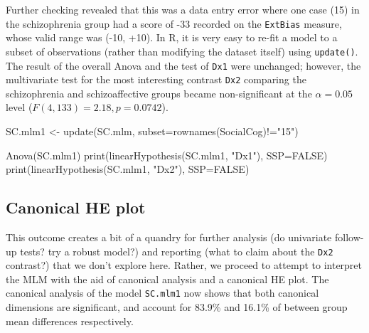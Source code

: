 \documentclass[
  letterpaper,
  10pt,
  krantz2]{krantz}
\makeatletter
\newenvironment{Shaded}{\begin{snugshade}}{\end{snugshade}}
\newcommand{\AttributeTok}[1]{\textcolor[rgb]{0.40,0.45,0.13}{#1}}
\newcommand{\ConstantTok}[1]{\textcolor[rgb]{0.56,0.35,0.01}{#1}}
\newcommand{\FunctionTok}[1]{\textcolor[rgb]{0.28,0.35,0.67}{#1}}
\newcommand{\NormalTok}[1]{\textcolor[rgb]{0.00,0.23,0.31}{#1}}
\newcommand{\OtherTok}[1]{\textcolor[rgb]{0.00,0.23,0.31}{#1}}
\newcommand{\SpecialCharTok}[1]{\textcolor[rgb]{0.37,0.37,0.37}{#1}}
\newcommand{\StringTok}[1]{\textcolor[rgb]{0.13,0.47,0.30}{#1}}
\newenvironment{kframe}{%
  \medskip{}
  \setlength{\fboxsep}{.8em}
  \def\at@end@of@kframe{}%
  \ifinner\ifhmode%
  \def\at@end@of@kframe{\end{minipage}}%
  \begin{minipage}{\columnwidth}%
  \fi\fi%
  \def\FrameCommand##1{\hskip\@totalleftmargin \hskip-\fboxsep
  \colorbox{shadecolor}{##1}\hskip-\fboxsep
      \hskip-\linewidth \hskip-\@totalleftmargin \hskip\columnwidth}%
  \MakeFramed {\advance\hsize-\width
    \@totalleftmargin\z@ \linewidth\hsize
    \@setminipage}}%
{\par\unskip\endMakeFramed%
  \at@end@of@kframe}
\renewenvironment{Shaded}{\begin{kframe}}{\end{kframe}}
\makeatother
\begin{document}
Further checking revealed that this was a data entry error where one
case (15) in the schizophrenia group had a score of -33 recorded on the
\texttt{ExtBias} measure, whose valid range was (-10, +10). In R, it is
very easy to re-fit a model to a subset of observations (rather than
modifying the dataset itself) using \texttt{update()}. The result of the
overall Anova and the test of \texttt{Dx1} were unchanged; however, the
multivariate test for the most interesting contrast \texttt{Dx2}
comparing the schizophrenia and schizoaffective groups became
non-significant at the \(\alpha=0.05\) level
(\(F(4, 133)=2.18, p = 0.0742\)).

\begin{Shaded}
\begin{Highlighting}[]
\NormalTok{SC.mlm1 }\OtherTok{\textless{}{-}} \FunctionTok{update}\NormalTok{(SC.mlm, }
                  \AttributeTok{subset=}\FunctionTok{rownames}\NormalTok{(SocialCog)}\SpecialCharTok{!=}\StringTok{"15"}\NormalTok{)}

\FunctionTok{Anova}\NormalTok{(SC.mlm1)}
\FunctionTok{print}\NormalTok{(}\FunctionTok{linearHypothesis}\NormalTok{(SC.mlm1, }\StringTok{"Dx1"}\NormalTok{), }\AttributeTok{SSP=}\ConstantTok{FALSE}\NormalTok{)}
\FunctionTok{print}\NormalTok{(}\FunctionTok{linearHypothesis}\NormalTok{(SC.mlm1, }\StringTok{"Dx2"}\NormalTok{), }\AttributeTok{SSP=}\ConstantTok{FALSE}\NormalTok{)}
\end{Highlighting}
\end{Shaded}

\subsection{Canonical HE plot}\label{canonical-he-plot}

This outcome creates a bit of a quandry for further analysis (do
univariate follow-up tests? try a robust model?) and reporting (what to
claim about the \texttt{Dx2} contrast?) that we don't explore here.
Rather, we proceed to attempt to interpret the MLM with the aid of
canonical analysis and a canonical HE plot. The canonical analysis of
the model \texttt{SC.mlm1} now shows that both canonical dimensions are
significant, and account for 83.9\% and 16.1\% of between group mean
differences respectively.
\end{document}
